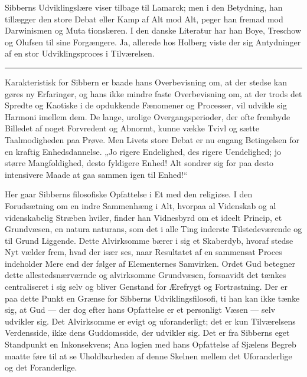 \documentclass[12pt,a4paper,openany]{book}
\newcommand{\opage}[1]{\marginnote{\footnotesize\textit{[#1]}}}
\begin{document}
Sibberns Udviklingslære viser tilbage til Lamarck; men i den Betydning, han
tillægger den store Debat eller Kamp af Alt mod Alt, peger han fremad mod
Darwinismen og Muta%
\setcounter{footnote}{0}%
\opage{105}tionslæren. I den danske Literatur har han Boye, Treschow og Olufsen
til sine Forgængere. Ja, allerede hos Holberg viste der sig Antydninger af en
stor Udviklingsproces i Tilværelsen.

\begin{center}\rule{2cm}{0.4pt}\end{center}

Karakteristisk for Sibbern er baade hans Overbevisning om, at der stedse kan
gøres ny Erfaringer, og hans ikke mindre faste Overbevisning om, at der trods
det Spredte og Kaotiske i de opdukkende Fænomener og Processer, vil udvikle sig
Harmoni imellem dem. De lange, urolige Overgangsperioder, der ofte frembyde
Billedet af noget Forvredent og Abnormt, kunne vække Tvivl og sætte
Taalmodigheden paa Prøve. Men Livets store Debat er nu engang Betingelsen for
en kraftig Enhedsdannelse. „Jo rigere Endelighed, des rigere Uendelighed; jo
større Mangfoldighed, desto fyldigere Enhed! Alt sondrer sig for paa desto
intensivere Maade at gaa sammen igen til Enhed!“

Her gaar Sibberns filosofiske Opfattelse i Et med den religiøse. I den
Forudsætning om en indre Sammenhæng i Alt, hvorpaa al Videnskab og al
videnskabelig Stræben hviler, finder han Vidnesbyrd om et ideelt Princip, et
Grundvæsen, en natura naturans, som det i alle Ting inderste Tilstedeværende og
til Grund Liggende. Dette Alvirksomme bærer i sig et Skaberdyb, hvoraf stedse
Nyt vælder frem, hvad der især ses, naar Resultatet af en sammensat Proces
indeholder Mere end der følger af Elementernes Samvirken. Ordet Gud betegner
dette allestedsnærværnde og alvirksomme Grundvæsen, forsaavidt det tænkes
centraliseret i sig selv og bliver Genstand for Ærefrygt og Fortrøstning. Der
er paa dette Punkt en Grænse for Sibberns Udviklingsfilosofi, ti han kan ikke
tænke sig, at Gud --- der dog efter hans Opfattelse er et personligt Væsen ---
selv udvikler sig. Det Alvirksomme er evigt og uforanderligt; det er kun
Tilværelsens Verdensside, ikke dens Guddomsside, der udvikler sig. Det er fra
Sibberns eget Standpunkt en Inkonsekvens; Ana%
\setcounter{footnote}{0}%
\opage{106}logien med hans Opfattelse af Sjælens Begreb maatte føre til at se
Uholdbarheden af denne Skelnen mellem det Uforanderlige og det Foranderlige.
\end{document}
